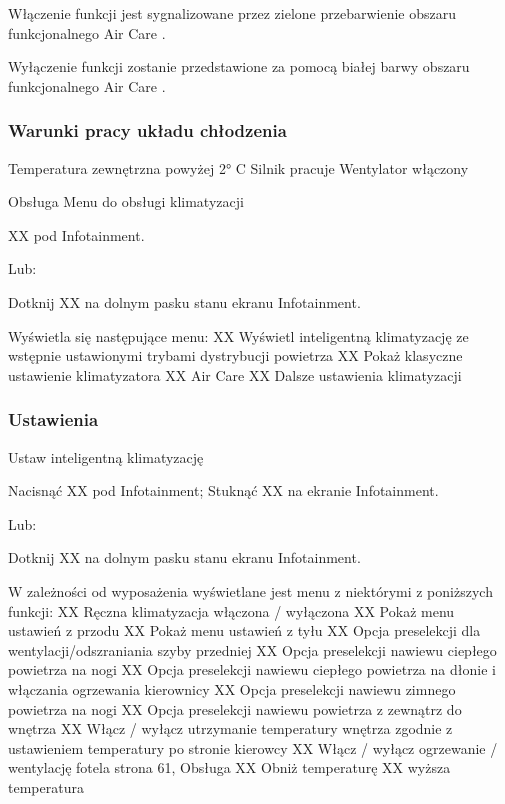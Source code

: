 Włączenie funkcji jest sygnalizowane przez zielone przebarwienie obszaru funkcjonalnego Air Care .

Wyłączenie funkcji zostanie przedstawione za pomocą białej barwy obszaru funkcjonalnego Air Care .

\subsubsection{Warunki pracy układu chłodzenia}
\begin{itemizeTick}
	\itemTick Temperatura zewnętrzna powyżej 2° C
	\itemTick Silnik pracuje
	\itemTick Wentylator włączony
\end{itemizeTick}


Obsługa
Menu do obsługi klimatyzacji

\begin{itemizeArrow}
	\itemArrow XX pod Infotainment.
\end{itemizeArrow}
Lub:
\begin{itemizeArrow}
	\itemArrow Dotknij XX na dolnym pasku stanu ekranu Infotainment.
\end{itemizeArrow}

Wyświetla się następujące menu:
XX Wyświetl inteligentną klimatyzację ze wstępnie ustawionymi trybami dystrybucji powietrza
XX Pokaż klasyczne ustawienie klimatyzatora
XX Air Care
XX Dalsze ustawienia klimatyzacji

\subsubsection{Ustawienia}

Ustaw inteligentną klimatyzację

\begin{itemizeArrow}
	\itemArrow Nacisnąć XX pod Infotainment; Stuknąć XX na ekranie Infotainment.
\end{itemizeArrow}
Lub:
\begin{itemizeArrow}
	\itemArrow Dotknij XX na dolnym pasku stanu ekranu Infotainment.
\end{itemizeArrow}

W zależności od wyposażenia wyświetlane jest menu z niektórymi z poniższych funkcji:
XX Ręczna klimatyzacja włączona / wyłączona
XX Pokaż menu ustawień z przodu
XX Pokaż menu ustawień z tyłu
XX Opcja preselekcji dla wentylacji/odszraniania szyby przedniej
XX Opcja preselekcji nawiewu ciepłego powietrza na nogi
XX Opcja preselekcji nawiewu ciepłego powietrza na dłonie i włączania ogrzewania kierownicy
XX Opcja preselekcji nawiewu zimnego powietrza na nogi
XX Opcja preselekcji nawiewu powietrza z zewnątrz do wnętrza
XX Włącz / wyłącz utrzymanie temperatury wnętrza zgodnie z ustawieniem temperatury po stronie kierowcy
XX Włącz / wyłącz ogrzewanie / wentylację fotela \guillemotright strona 61, Obsługa
XX Obniż temperaturę
XX wyższa temperatura

